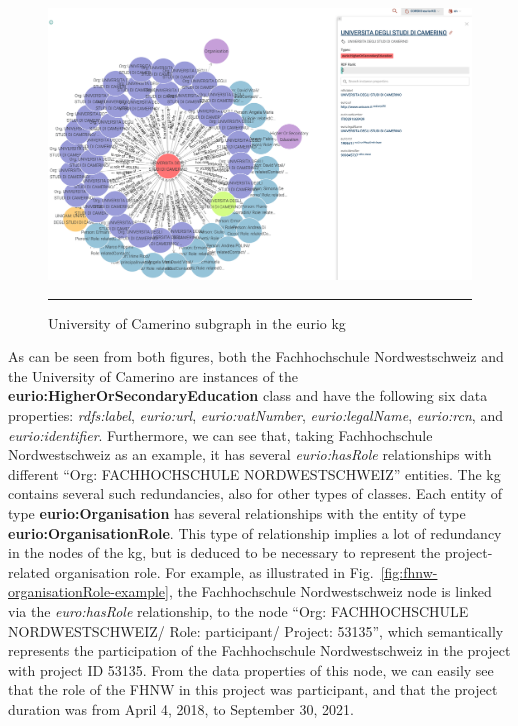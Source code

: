 \begin{figure}[htbp]
    \centering
 \includegraphics[width=.8\textwidth]{figures/architecture/graphdb-unicam.png}
     \rule{35em}{0.5pt}
    \caption{University of Camerino subgraph in the \gls{eurio} \gls{kg}}
 \label{fig:unicam-graphdb}
\end{figure}
As can be seen from both figures, both the Fachhochschule Nordwestschweiz and the University of Camerino are instances of the \textbf{eurio:HigherOrSecondaryEducation} class and have the following six data properties: \textit{rdfs:label}, \textit{eurio:url}, \textit{eurio:vatNumber}, \textit{eurio:legalName}, \textit{eurio:rcn}, and \textit{eurio:identifier}.
Furthermore, we can see that, taking Fachhochschule Nordwestschweiz as an example, it has several \textit{eurio:hasRole} relationships with different ``Org: FACHHOCHSCHULE NORDWESTSCHWEIZ'' entities.
The \gls{kg} contains several such redundancies, also for other types of classes.
Each entity of type \textbf{eurio:Organisation} has several relationships with the entity of type \textbf{eurio:OrganisationRole}.
This type of relationship implies a lot of redundancy in the nodes of the \gls{kg}, but is deduced to be necessary to represent the project-related organisation role.
For example, as illustrated in Fig.~\ref{fig:fhnw-organisationRole-example}, the Fachhochschule Nordwestschweiz node is linked via the \textit{euro:hasRole} relationship, to the node ``Org: FACHHOCHSCHULE NORDWESTSCHWEIZ/ Role: participant/ Project: 53135'', which semantically represents the participation of the Fachhochschule Nordwestschweiz in the project with project ID 53135.
From the data properties of this node, we can easily see that the role of the FHNW in this project was participant, and that the project duration was from April 4, 2018, to September 30, 2021.

